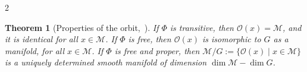 \documentclass{article}
\newtheorem{theorem}{Theorem}[section]
\newtheorem{definition}[theorem]{Definition}
\newtheorem{remark}[theorem]{Remark}
\newcommand{\yannik}[1]{\textcolor{blue}{\textbf{YW}:~#1}}
\newcommand{\federico}[1]{\textcolor{BrickRed}{\textbf{FC}:~#1}}
\newcommand{\patrick}[1]{\textcolor{teal}{\textbf{PB}:~#1}}
\newcommand{\M}{\mathcal{M}}                                %
\newcommand{\state}{x}
\newcommand{\appstate}{\bar{x}}
\begin{document}
\begin{multicols}{2}
\begin{theorem}[Properties of the orbit,~\cite{Holm2009}]\label{thm:properties_of_orbit}
    If $\Phi$ is transitive, then $\mathcal{O}(\state) = \M$, and it is identical for all $\state\in\M$. If $\Phi$ is free, then $\mathcal{O}(\state)$ is isomorphic to $G$ as a manifold, for all $\state \in \M$. If $\Phi$ is free and proper, then $\M/G := \{\mathcal{O}(\state) \;|\; \state \in \M\}$ is a uniquely determined smooth manifold of dimension $\dim \M - \dim G$.   
\end{theorem}







\end{multicols}
\end{document}
